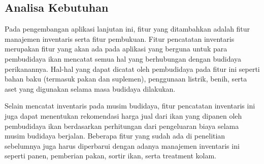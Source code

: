 \begin{spacing}{1.5}
\section{Analisa Kebutuhan}

Pada pengembangan aplikasi lanjutan ini, fitur yang ditambahkan adalah fitur manajemen inventaris serta fitur pembukuan. Fitur pencatatan inventaris merupakan fitur yang akan ada pada aplikasi yang berguna untuk para pembudidaya ikan mencatat semua hal yang berhubungan dengan budidaya perikanannya. Hal-hal yang dapat dicatat oleh pembudidaya pada fitur ini seperti bahan baku (termasuk pakan dan suplemen), penggunaan listrik, benih, serta aset yang digunakan selama masa budidaya dilakukan.

Selain mencatat inventaris pada musim budidaya, fitur pencatatan inventaris ini juga dapat menentukan rekomendasi harga jual dari ikan yang dipanen oleh pembudidaya ikan berdasarkan perhitungan dari pengeluaran biaya selama musim budidaya berjalan. Beberapa fitur yang sudah ada di penelitian sebelumnya juga harus diperbarui dengan adanya manajemen inventaris ini seperti panen, pemberian pakan, sortir ikan, serta treatment kolam.


\end{spacing}
